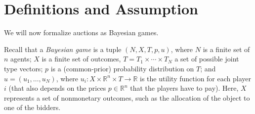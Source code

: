 \section{Definitions and Assumption}
\label{sec:auc:2}
We will now formalize auctions as Bayesian games.

Recall that a \emph{Bayesian game} is a tuple $(N,X,T,p,u)$, where $N$ is a finite set of $n$ agents; $X$ is a finite set of outcomes, $T=T_1 \times \cdots \times T_N$ a set of possible joint type vectors; $p$ is a (common-prior) probability distribution on $T$; and $u=(u_1,\dots,u_N)$, where $u_i \colon X \times \mathbb{R}^n \times T \to \mathbb{R}$ is the utility function for each player $i$ (that also depends on the prices $p\in \mathbb{R}^n$ that the players have to pay). Here, $X$ represents a set of nonmonetary outcomes, such as the allocation of the object to one of the bidders.


